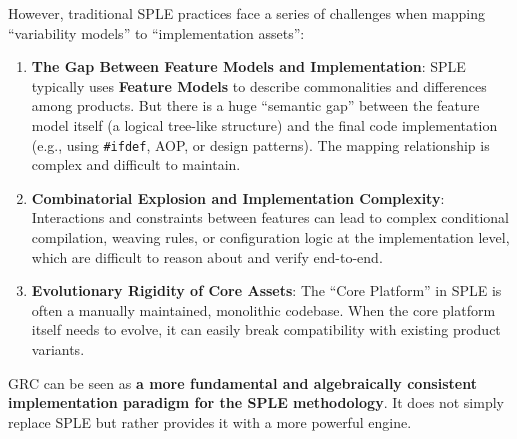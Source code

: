 \documentclass[11pt]{article}
\begin{document}
However, traditional SPLE practices face a series of challenges when mapping ``variability models'' to ``implementation assets'':
\begin{enumerate}
    \item \textbf{The Gap Between Feature Models and Implementation}: SPLE typically uses \textbf{Feature Models} to describe commonalities and differences among products. But there is a huge ``semantic gap'' between the feature model itself (a logical tree-like structure) and the final code implementation (e.g., using \texttt{\#ifdef}, AOP, or design patterns). The mapping relationship is complex and difficult to maintain.
    
    \item \textbf{Combinatorial Explosion and Implementation Complexity}: Interactions and constraints between features can lead to complex conditional compilation, weaving rules, or configuration logic at the implementation level, which are difficult to reason about and verify end-to-end.
    
    \item \textbf{Evolutionary Rigidity of Core Assets}: The ``Core Platform'' in SPLE is often a manually maintained, monolithic codebase. When the core platform itself needs to evolve, it can easily break compatibility with existing product variants.
\end{enumerate}

GRC can be seen as \textbf{a more fundamental and algebraically consistent implementation paradigm for the SPLE methodology}. It does not simply replace SPLE but rather provides it with a more powerful engine.
\end{document}
